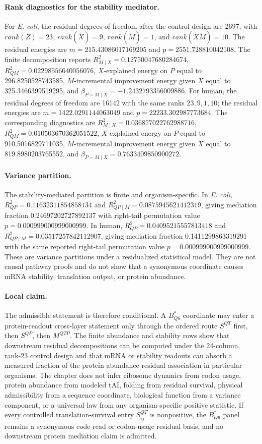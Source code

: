 \paragraph{Rank diagnostics for the stability mediator.}
For \emph{E. coli}, the residual degrees of freedom after the control design are 2697, with $rank(Z)=23$, $rank(\widetilde X)=9$, $rank(\widetilde M)=1$, and $rank(\widetilde X\widetilde M)=10$. The residual energies are $m=215.43086017169205$ and $p=2551.728810042108$. The finite decomposition reports $R^2_{M\mid X}=0.12750047680284674$, $R^2_{QM}=0.02298556640056076$, $X$-explained energy on $P$ equal to 296.8250528743585, $M$-incremental improvement energy given $X$ equal to 325.3466399519295, and $\beta_{P\sim M\mid X}=-1.2432793356009886$. For human, the residual degrees of freedom are 16142 with the same ranks $23,9,1,10$; the residual energies are $m=1422.0291144063049$ and $p=22233.302987773684$. The corresponding diagnostics are $R^2_{M\mid X}=0.036877022762988716$, $R^2_{QM}=0.010503670362051522$, $X$-explained energy on $P$ equal to 910.5016829711035, $M$-incremental improvement energy given $X$ equal to 819.8980203765552, and $\beta_{P\sim M\mid X}=0.7633409850900272$.

\paragraph{Variance partition.}
The stability-mediated partition is finite and organism-specific. In \emph{E. coli}, $R^2_{QP}=0.11632311854858134$ and $R^2_{QP\mid M}=0.0875945621412319$, giving mediation fraction 0.24697202727892137 with right-tail permutation value $p=0.000999000999000999$. In human, $R^2_{QP}=0.04095215557813418$ and $R^2_{QP\mid M}=0.03517257842112907$, giving mediation fraction 0.1411299863319291 with the same reported right-tail permutation value $p=0.000999000999000999$. These are variance partitions under a residualized statistical model. They are not causal pathway proofs and do not show that a synonymous coordinate causes mRNA stability, translation output, or protein abundance.

\paragraph{Local claim.}
The admissible statement is therefore conditional. A $B^{*}_{Q6}$ coordinate may enter a protein-readout cross-layer statement only through the ordered route $S^{QT}$ first, then $S^{QP}$, then $M^{QTP}$. The finite abundance and stability rows show that downstream residual decompositions can be computed under the 24-column, rank-23 control design and that mRNA or stability readouts can absorb a measured fraction of the protein-abundance residual association in particular organisms. The chapter does not infer ribosome dynamics from codon usage, protein abundance from modeled tAI, folding from residual survival, physical admissibility from a sequence coordinate, biological function from a variance component, or a universal law from any organism-specific positive statistic. If every controlled translation-survival entry $S^{QT}_{ij}$ is nonpositive, the $B^{*}_{Q6}$ panel remains a synonymous code-read or codon-usage residual basis, and no downstream protein mediation claim is admitted.
